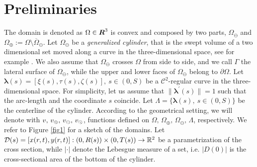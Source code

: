 \documentclass[r]{siamart171218}
\begin{document}

\section{Preliminaries}\label{sec:setting}


The domain is denoted as $\Omega\in \boldsymbol R^3 $ is convex and composed by two parts, 
$\Omega_{\ominus}$ and $\Omega_{\oplus}:=\Omega\setminus\overline{\Omega}_{\ominus}$. 
Let $\Omega_{\ominus}$ be a \emph{generalized cylinder}, 
that is the swept volume of a two dimensional set moved along a curve in the three-dimensional space, see for example \cite{MR1940257}.
We also assume that $\Omega_{\ominus}$ crosses $\Omega$ from side to side, and we call $\Gamma$ the lateral surface of $\Omega_{\ominus}$, 
while the upper and lower faces of $\Omega_{\ominus}$ belong to $\partial\Omega$. 
Let $\boldsymbol \lambda(s) = [\xi(s), \tau(s), \zeta(s)], \ s\in(0,S)$ be a $\mathcal{C}^2$-regular curve in the three-dimensional space.
For simplicity, let us assume that $\|\boldsymbol \lambda^\prime(s)\|=1$ such that the arc-length and the coordinate $s$ coincide.
Let $\Lambda = \{\boldsymbol \lambda(s), \ s\in(0,S)\}$ be the centerline of the cylinder. 
According to the geometrical setting, we will denote with $v,\,v_\oplus,\,v_\ominus,\,v_{\odot}$,
functions defined on $\Omega,\,\Omega_{\oplus},\,\Omega_{\ominus},\,\Lambda$, respectively.
We refer to Figure \ref{fig1} for a sketch of the domains.
Let $\mathcal{D}(s) = [x(r,t),y(r,t)]: (0,R(s))\times(0,T(s)) \rightarrow \mathbb{R}^2$ be a parametrization of the cross section, while 
$|\cdot|$ denote the Lebesgue measure of a set, i.e. $|D(0)|$ is the cross-sectional area of the bottom of the cylinder. 
\end{document}
